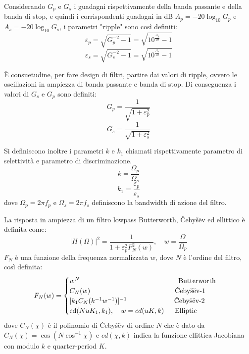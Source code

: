 \documentclass[12pt]{report}
\begin{document}
Considerando \(G_p\) e \(G_s\) i guadagni rispettivamente della banda passante e della banda di stop, e quindi i corrispondenti guadagni in dB \(A_p = -20\log_{10}{G_p}\) e \(A_s= -20\log_{10}{G_s}\), i parametri "ripple" sono così definiti:
\begin{equation}
    \varepsilon_p=\sqrt{G_p^{-2}-1}=\sqrt{10^{\frac{A_p}{10}}-1}
\end{equation}
\begin{equation}
    \varepsilon_s=\sqrt{G_s^{-2}-1}=\sqrt{10^{\frac{A_s}{10}}-1}
\end{equation}

È consuetudine, per fare design di filtri, partire dai valori di ripple, ovvero le oscillazioni in ampiezza di banda passante e banda di stop. Di conseguenza i valori di \(G_s\) e \(G_p\) sono definiti:
\begin{equation}
    G_p=\frac{1}{\sqrt{1+\varepsilon_p^2}}
\end{equation}
\begin{equation}
    G_s=\frac{1}{\sqrt{1+\varepsilon_s^2}}
\end{equation}

Si definiscono inoltre i parametri \(k\) e \(k_1\) chiamati rispettivamente parametro di selettività e parametro di discriminazione.
\begin{equation}
    k=\frac{\Omega_p}{\Omega_s}
\end{equation}
\begin{equation}
    k_1=\frac{\varepsilon_p}{\varepsilon_s}
\end{equation}
dove \(\Omega_p = 2\pi f_p\) e \(\Omega_s = 2\pi f_s\) definiscono la bandwidth di azione del filtro.

La risposta in ampiezza di un filtro lowpass Butterworth, Čebyšëv ed ellittico è definita come:
\begin{equation}
    |H(\Omega)|^2= \frac{1}{1+\varepsilon_p^2F_N^2(w)}, \quad w=\frac{\Omega}{\Omega_p}
\end{equation}
\(F_N\) è una funzione della frequenza normalizzata \(w\), dove \(N\) è l'ordine del filtro, così definita:
\begin{equation}
    F_N(w)=\begin{cases}
    w^N \hspace{5cm} \text{Butterworth} \\
    C_N(w) \hspace{4.3cm} \text{Čebyšëv-1} \\
    [k_1C_N(k^{-1}w^{-1})]^{-1} \hspace{2.4cm} \text{Čebyšëv-2} \\
    \text{cd}(NuK_1, k_1), \quad w = cd(uK, k) \hspace{0.55cm} \text{Elliptic}
    \end{cases}
\end{equation}
dove \(C_N(\chi)\) è il polinomio di Čebyšëv di ordine \(N\) che è dato da \(C_N(\chi)=\cos(N\cos^{-1}{\chi})\) e \(cd(\chi,k)\) indica la funzione ellittica Jacobiana con modulo \(k\) e quarter-period \(K\).
\end{document}
